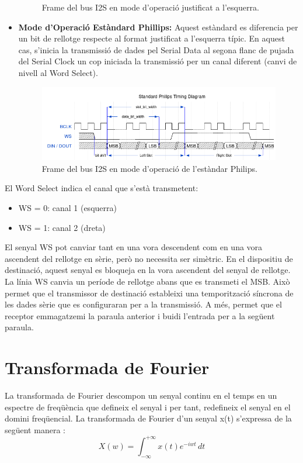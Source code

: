 \begin{itemize}
\begin{figure}[H]
        \caption{Frame del bus I2S en mode d'operació justificat a l'esquerra. \cite{I2SESP32}}
        \label{I2SLeftJust_fig}
    \end{figure}
    \item \textbf{Mode d'Operació Estàndard Phillips:} Aquest estàndard es diferencia per un bit de rellotge respecte al format justificat a l'esquerra típic. En aquest cas, s'inicia la transmissió de dades pel Serial Data al segona flanc de pujada del Serial Clock un cop iniciada la transmissió per un canal diferent (canvi de nivell al Word Select).
    \begin{figure}[H]
        \centering
        \includegraphics[width=0.7\linewidth]{Images/I2SPhilips.png}
        \caption{Frame del bus I2S en mode d'operació de l'estàndar Philips. \cite{I2SESP32}}
        \label{I2SPhilips_fig}
    \end{figure}
\end{itemize}
\par El Word Select indica el canal que s'està transmetent:
\begin{itemize}
    \item WS = 0: canal 1 (esquerra)
    \item WS = 1: canal 2 (dreta)
\end{itemize}

\par El senyal WS pot canviar tant en una vora descendent com en una vora ascendent del rellotge en sèrie, però no necessita ser simètric. En el dispositiu de destinació, aquest senyal es bloqueja en la vora ascendent del senyal de rellotge. La línia WS canvia un període de rellotge abans que es transmeti el MSB. Això permet que el transmissor de destinació estableixi una temporització síncrona de les dades sèrie que es configuraran per a la transmissió. A més, permet que el receptor emmagatzemi la paraula anterior i buidi l'entrada per a la següent paraula.

\section{Transformada de Fourier}
\par La transformada de Fourier descompon un senyal continu en el temps en un espectre de freqüència que defineix el senyal i per tant, redefineix el senyal en el domini freqüencial. La transformada de Fourier d'un senyal x(t) s'expressa de la següent manera \cite{Bose1985}:
\begin{equation}\label{eqTransFourier}
    X(w) = \int_{-\infty}^{+\infty} x(t)e^{-iwt} \,dt 
\end{equation}

